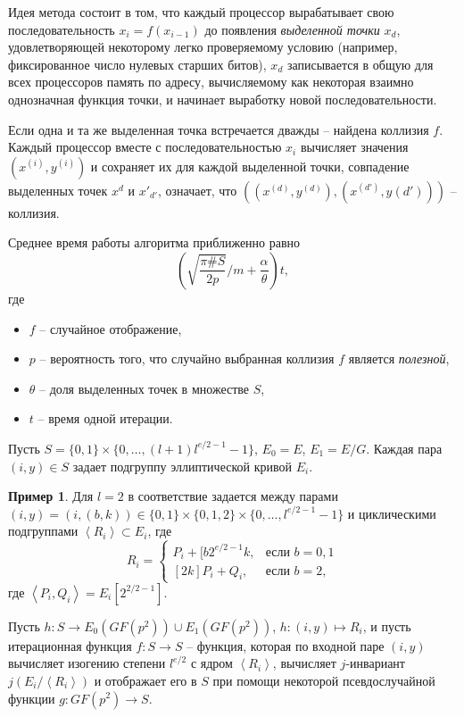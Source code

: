 \documentclass[a4paper,12pt]{article}
\newcommand{\tr}[1]{\left\langle #1\right\rangle}
\theoremstyle{definition}
\newtheorem{example}{Пример}
\begin{document}
Идея метода состоит в том, что
каждый процессор вырабатывает свою последовательность $x_i=f(x_{i-1})$ до появления \emph{выделенной точки} $x_d$, удовлетворяющей некоторому легко проверяемому условию (например, фиксированное число нулевых старших битов), $x_d$ записывается в общую для всех процессоров память по адресу, вычисляемому как некоторая взаимно однозначная функция точки, и начинает выработку новой последовательности.


Если одна и та же выделенная точка встречается дважды -- найдена коллизия $f$. Каждый процессор вместе с последовательностью $x_i$ вычисляет значения $(x^{(i)},y^{(i)})$ и сохраняет их для каждой выделенной точки, совпадение выделенных точек $x^d$ и $x'_{d'}$, означает, что $((x^{(d)}, y^{(d)}), (x^{(d')}, y{(d')}))$ -- коллизия.

Среднее время работы алгоритма приближенно равно
$$
\left(\sqrt{\frac{\pi\#S}{2p}}/m+\frac{\alpha}{\theta}\right)t,
$$
где
\begin{itemize}
\item $f$ -- случайное отображение,
\item $p$ -- вероятность того, что случайно выбранная коллизия $f$ является \emph{полезной},
\item $\theta$ -- доля выделенных точек в множестве $S$,
\item $t$ -- время одной итерации.
\end{itemize}

Пусть $S=\{0,1\}\times\{0,\dots,(l+1)l^{e/2-1}-1\}$, $E_0=E$, $E_1=E/G$.  Каждая пара $(i,y)\in S$ задает подгруппу эллиптической кривой $E_i$. 
\begin{example}
 Для $l=2$ в \cite{Adj} соответствие задается между парами $(i,y)=(i,(b,k))\in\{0,1\}\times\{0,1,2\}\times \{0,\dots,l^{e/2-1}-1\}$ и 
 циклическими подгруппами $\tr{R_i}\subset E_i$, где
 \begin{equation*}
R_i = 
 \begin{cases}
   P_i+[b2^{e/2-1}k,  &\text{если } b=0,1 \\
   [2k]P_i+Q_i,  &\text{если } b=2,
 \end{cases}
\end{equation*}
где $\tr{P_i,Q_i} = E_i[2^{2/2-1}]$.
\end{example}

Пусть $h:S\to E_0(GF(p^2))\cup E_1(GF(p^2))$, $h:(i,y)\mapsto R_i$, и  пусть итерационная функция $f:S\to S$ -- функция, которая по входной паре $(i,y)$
вычисляет изогению степени $l^{e/2}$ с ядром $\tr{R_i}$, вычисляет $j$-инвариант $j(E_i/\tr{R_i})$ и отображает его в $S$ при помощи некоторой псевдослучайной
функции $g: GF(p^2)\to S$.
\end{document}
